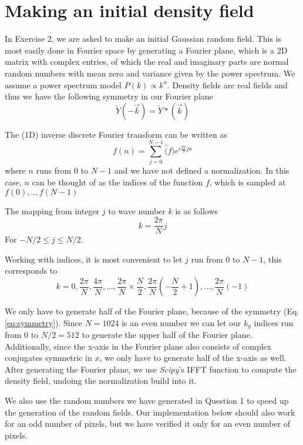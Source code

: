 \section{Making an initial density field}
In Exercise 2, we are asked to make an initial Gaussian random field. This is most easily done in Fourier space by generating a Fourier plane, which is a 2D matrix with complex entries, of which the real and imaginary parts are normal random numbers with mean zero and variance given by the power spectrum. We assume a power spectrum model $P(k) \propto k^n$. Density fields are real fields and thus we have the following symmetry in our Fourier plane
\begin{equation}\label{eq:symmetry}
\tilde{Y}(-\vec{k}) = \tilde{Y}*(\vec{k})
\end{equation}


The (1D) inverse discrete Fourier transform can be written as
\begin{equation}
f(n) = \sum_{j=0}^{N-1} \hat(f) e^{i \frac{2\pi}{N} jn}
\end{equation}
where $n$ runs from $0$ to $N-1$ and we have not defined a normalization. In this case, $n$ can be thought of as the indices of the function $f$, which is sampled at $f(0),..,f(N-1)$

The mapping from integer $j$ to wave number $k$ is as follows
\begin{equation}
k = \frac{2\pi}{N} j
\end{equation}
For $-N/2 \leq j \leq N/2$.

Working with indices, it is most convenient to let $j$ run from $0$ to $N-1$, this corresponds to 
$$k=0,\frac{2\pi}{N},\frac{4\pi}{N},...,\frac{2\pi}{N}\times \frac{N}{2}, \frac{2\pi}{N}\left(-\frac{N}{2}+1\right),...,\frac{2\pi}{N}(-1) $$

We only have to generate half of the Fourier plane, because of the symmetry (Eq. \ref{eq:symmetry}). Since $N=1024$ is an even number we can let our $k_y$ indices run from $0$ to $N/2=512$ to generate the upper half of the Fourier plane. Additionally, since the x-axis in the Fourier plane also consists of complex conjugates symmetric in $x$, we only have to generate half of the x-axis as well. 
After generating the Fourier plane, we use \textit{Scipy}'s IFFT function to compute the density field, undoing the normalization build into it. 

We also use the random numbers we have generated in Question 1 to speed up the generation of the random fields. 
Our implementation below should also work for an odd number of pixels, but we have verified it only for an even number of pixels. 


